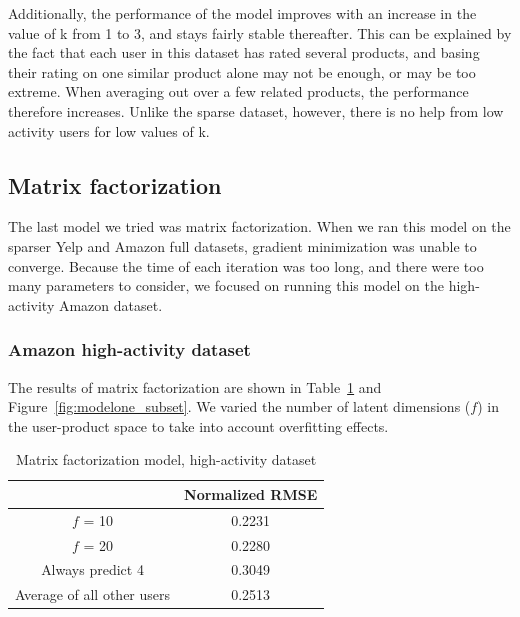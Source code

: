 \documentclass[letterpaper, 11 pt, conference]{ieeeconf}
\begin{document}
Additionally, the performance of the model improves with an increase in
the value of k from 1 to 3, and stays fairly stable thereafter. This can
be explained by the fact that each user in this dataset has rated several
products, and basing their rating on one similar product alone may not be
enough, or may be too extreme. When averaging out over a few related
products, the performance therefore increases. Unlike the sparse dataset,
however, there is no help from low activity users for low values of k.



\subsection{Matrix factorization}
The last model we tried was matrix factorization. When we ran this model on the 
sparser Yelp and Amazon full datasets, gradient minimization was unable to 
converge. Because the time of each iteration was too long, and there were too 
many parameters to consider, we focused on running this model on the 
high-activity Amazon dataset.

\subsubsection{Amazon high-activity dataset}
The results of matrix factorization are shown in 
Table~\ref{table:modelthree_subset} and
Figure~\ref{fig:modelone_subset}. We varied the number of latent dimensions ($f$)
in the user-product space to take into account overfitting effects. 

\begin{table}[htb]
\centering
\begin{tabular}{|c|c|}
\cline{2-2}

\multicolumn{1}{c|}{} & {Normalized RMSE} \tabularnewline \hline
$f$ = 10 & 0.2231 \tabularnewline
$f$ = 20 & 0.2280 \tabularnewline
\hline
Always predict 4 & 0.3049 \tabularnewline 
Average of all other users & 0.2513 \tabularnewline
\hline
\end{tabular}
\caption{Matrix factorization model, high-activity dataset}
\label{table:modelthree_subset}
\end{table}
\end{document}
